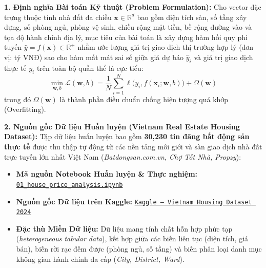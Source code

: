 \documentclass[12pt,a4paper]{report}
\begin{document}
\textbf{1. Định nghĩa Bài toán Kỹ thuật (Problem Formulation):}
Cho vector đặc trưng thuộc tính nhà đất đa chiều $\mathbf{x} \in \mathbb{R}^d$ bao gồm diện tích sàn, số tầng xây dựng, số phòng ngủ, phòng vệ sinh, chiều rộng mặt tiền, bề rộng đường vào và tọa độ hành chính địa lý, mục tiêu của bài toán là xây dựng hàm hồi quy phi tuyến $\hat{y} = f(\mathbf{x}) \in \mathbb{R}^+$ nhằm ước lượng giá trị giao dịch thị trường hợp lý (đơn vị: tỷ VNĐ) sao cho hàm mất mát sai số giữa giá dự báo $\hat{y}_i$ và giá trị giao dịch thực tế $y_i$ trên toàn bộ quần thể là cực tiểu:
\begin{equation}
\min_{\mathbf{w}, b} \mathcal{L}(\mathbf{w}, b) = \frac{1}{N} \sum_{i=1}^N \ell\big(y_i, f(\mathbf{x}_i; \mathbf{w}, b)\big) + \Omega(\mathbf{w})
\end{equation}
trong đó $\Omega(\mathbf{w})$ là thành phần điều chuẩn chống hiện tượng quá khớp (Overfitting).

\textbf{2. Nguồn gốc Dữ liệu Huấn luyện (Vietnam Real Estate Housing Dataset):}
Tập dữ liệu huấn luyện bao gồm \textbf{30,230 tin đăng bất động sản thực tế} được thu thập tự động từ các nền tảng môi giới và sàn giao dịch nhà đất trực tuyến lớn nhất Việt Nam (\textit{Batdongsan.com.vn, Chợ Tốt Nhà, Propzy}):
\begin{itemize}[leftmargin=1.5em, itemsep=2pt]
    \item \textbf{Mã nguồn Notebook Huấn luyện \& Thực nghiệm:} \href{https://github.com/phamtu2x5/INTELLIGENT-SYSTEM-DEVELOPMENT/blob/main/src/Week%202/house_price_prediction/notebooks/01_house_price_analysis.ipynb}{\texttt{01\_house\_price\_analysis.ipynb}}
    \item \textbf{Nguồn gốc Dữ liệu trên Kaggle:} \href{https://www.kaggle.com/datasets/nguyentiennhan/vietnam-housing-dataset-2024}{\texttt{Kaggle -- Vietnam Housing Dataset 2024}}
    \item \textbf{Đặc thù Miền Dữ liệu:} Dữ liệu mang tính chất hỗn hợp phức tạp (\textit{heterogeneous tabular data}), kết hợp giữa các biến liên tục (diện tích, giá bán), biến rời rạc đếm được (phòng ngủ, số tầng) và biến phân loại danh mục không gian hành chính đa cấp (\textit{City, District, Ward}).
\end{itemize}
\end{document}
